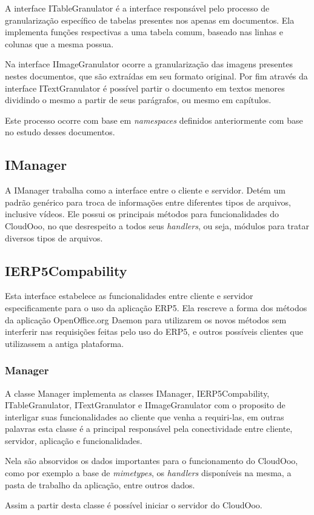 A interface ITableGranulator é a interface responsável pelo processo de granularização específico de tabelas presentes nos apenas em documentos. Ela implementa funções respectivas a uma tabela comum, baseado nas linhas e colunas que a mesma possua.

Na interface IImageGranulator ocorre a granularização das imagens presentes nestes documentos, que são extraídas em seu formato original.
Por fim através da interface ITextGranulator é possível partir o documento em textos menores dividindo o mesmo a partir de seus parágrafos, ou mesmo em capítulos.

Este processo ocorre com base em \textit{namespaces} definidos anteriormente com base no estudo desses documentos.

\subsection{IManager}

A IManager trabalha como a interface entre o cliente e servidor. Detém um padrão genérico para troca de informações entre diferentes tipos de arquivos, inclusive vídeos. Ele possui os principais métodos para funcionalidades do CloudOoo, no que desrespeito a todos seus \textit{handlers}, ou seja, módulos para tratar diversos tipos de arquivos.

\subsection{IERP5Compability}

Esta interface estabelece as funcionalidades entre cliente e servidor especificamente para o uso da aplicação ERP5. Ela rescreve a forma dos métodos da aplicação OpenOffice.org Daemon para utilizarem os novos métodos sem interferir nas requisições feitas pelo uso do ERP5, e outros possíveis clientes que utilizassem a antiga plataforma.

\subsubsection{Manager}

A classe Manager implementa as classes IManager, IERP5Compability, ITableGranulator, ITextGranulator e IImageGranulator com o proposito de interligar suas funcionalidades ao cliente que venha a requiri-las, em outras palavras esta classe é a principal responsável pela conectividade entre cliente, servidor, aplicação e funcionalidades.

Nela são absorvidos os dados importantes para o funcionamento do CloudOoo, como por exemplo a base de \textit{mimetypes}, os \textit{handlers} disponíveis na mesma, a pasta de trabalho da aplicação, entre outros dados.

Assim a partir desta classe é possível iniciar o servidor do CloudOoo.
